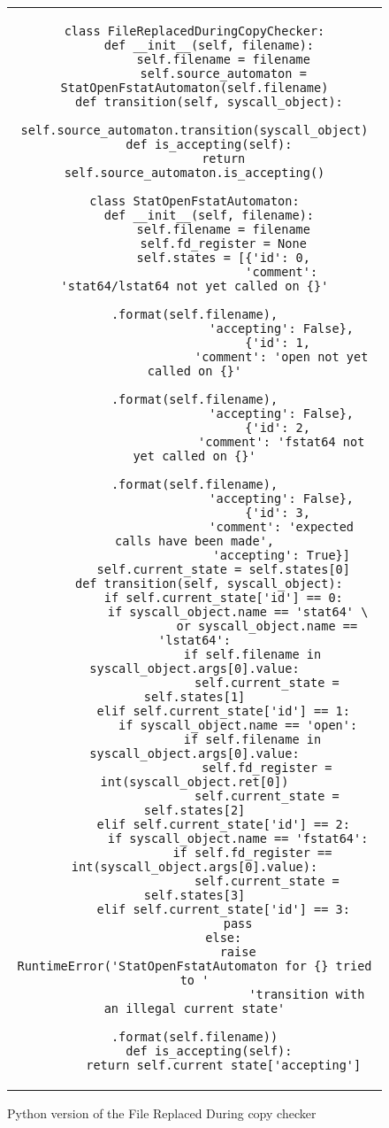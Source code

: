 \begin{figure}[H]
\centering
\begin{tabular}{c}
\begin{lstlisting}
class FileReplacedDuringCopyChecker:
    def __init__(self, filename):
        self.filename = filename
        self.source_automaton = StatOpenFstatAutomaton(self.filename)
    def transition(self, syscall_object):
        self.source_automaton.transition(syscall_object)
    def is_accepting(self):
        return self.source_automaton.is_accepting()

class StatOpenFstatAutomaton:
    def __init__(self, filename):
        self.filename = filename
        self.fd_register = None
        self.states = [{'id': 0,
                        'comment': 'stat64/lstat64 not yet called on {}'
                                   .format(self.filename),
                        'accepting': False},
                       {'id': 1,
                        'comment': 'open not yet called on {}'
                                   .format(self.filename),
                        'accepting': False},
                       {'id': 2,
                        'comment': 'fstat64 not yet called on {}'
                            .format(self.filename),
                        'accepting': False},
                       {'id': 3,
                        'comment': 'expected calls have been made',
                        'accepting': True}]
        self.current_state = self.states[0]
    def transition(self, syscall_object):
        if self.current_state['id'] == 0:
            if syscall_object.name == 'stat64' \
                    or syscall_object.name == 'lstat64':
                if self.filename in syscall_object.args[0].value:
                    self.current_state = self.states[1]
        elif self.current_state['id'] == 1:
            if syscall_object.name == 'open':
                if self.filename in syscall_object.args[0].value:
                    self.fd_register = int(syscall_object.ret[0])
                    self.current_state = self.states[2]
        elif self.current_state['id'] == 2:
            if syscall_object.name == 'fstat64':
                if self.fd_register == int(syscall_object.args[0].value):
                    self.current_state = self.states[3]
        elif self.current_state['id'] == 3:
            pass
        else:
            raise RuntimeError('StatOpenFstatAutomaton for {} tried to '
                               'transition with an illegal current state'
                               .format(self.filename))
    def is_accepting(self):
        return self.current_state['accepting']
\end{lstlisting}
\end{tabular}
\caption{Python version of the File Replaced During copy checker}
\label{lst:FileReplacedPython}
\end{figure}


